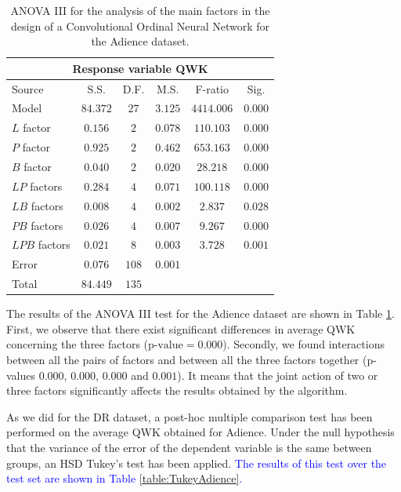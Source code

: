 \documentclass[journal]{IEEEtran}
\begin{document}
	\begin{table}[!t]
		\caption{ANOVA III for the analysis of the main factors in the design of a Convolutional Ordinal Neural Network for the Adience dataset.}
		\label{table:ANOVAAdience}
		\centering
		\small
		\begin{tabular}{lccccc}
			\hline\hline
			            \multicolumn{6}{c}{Response variable QWK}             \\ \hline
			Source        &   S.S.   & D.F.  &  M.S.   &  F-ratio   &  Sig.   \\ \hline
			Model         & $84.372$ & $27$  & $3.125$ & $4414.006$ & $0.000$ \\
			$L$ factor    & $0.156$  &  $2$  & $0.078$ & $110.103$  & $0.000$ \\
			$P$ factor    & $0.925$  &  $2$  & $0.462$ & $653.163$  & $0.000$ \\
			$B$ factor    & $0.040$  &  $2$  & $0.020$ &  $28.218$  & $0.000$ \\
			$LP$ factors  & $0.284$  &  $4$  & $0.071$ & $100.118$  & $0.000$ \\
			$LB$ factors  & $0.008$  &  $4$  & $0.002$ &  $2.837$   & $0.028$ \\
			$PB$ factors  & $0.026$  &  $4$  & $0.007$ &  $9.267$   & $0.000$ \\
			$LPB$ factors & $0.021$  &  $8$  & $0.003$ &  $3.728$   & $0.001$ \\
			Error         & $0.076$  & $108$ & $0.001$ &            &  \\ \hline
			Total         & $84.449$ & $135$ &         &            &  \\ \hline\hline
		\end{tabular}
	\end{table}
	
	The results of the ANOVA III test for the Adience dataset are shown in Table \ref{table:ANOVAAdience}. First, we observe that there exist significant differences in average QWK concerning the three factors ($\text{p-value} = 0.000$). Secondly, we found interactions between all the pairs of factors and between all the three factors together (p-values $0.000$, $0.000$, $0.000$ and $0.001$). It means that the joint action of two or three factors significantly affects the results obtained by the algorithm.
	
	As we did for the DR dataset, a post-hoc multiple comparison test has been performed on the average QWK obtained for Adience. Under the null hypothesis that the variance of the error of the dependent variable is the same between groups, an HSD Tukey's test has been applied. \textcolor{blue}{The results of this test over the test set are shown in Table \ref{table:TukeyAdience}.}
	
\end{document}
